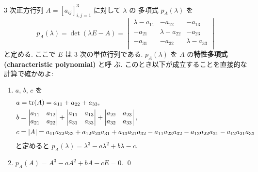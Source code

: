 \documentclass[12pt,twoside]{jarticle}
\begin{document}

\begin{question}
  \label{q:CH-3x3}
  $3$ 次正方行列 $A=[a_{ij}]_{i,j=1}^3$ に対して $\lambda$ の
  多項式 $p_A(\lambda)$ を
  \begin{equation*}
    p_A(\lambda) = \det(\lambda E - A) =
    \begin{vmatrix}
      \lambda-a_{11} &        -a_{12} &        -a_{13} \\
             -a_{21} & \lambda-a_{22} &        -a_{23} \\
             -a_{31} &        -a_{32} & \lambda-a_{33} \\
    \end{vmatrix}
  \end{equation*}
  と定める.  ここで $E$ は $3$ 次の単位行列である. 
  $p_A(\lambda)$ を $A$ の{\bf 特性多項式 (characteristic polynomial)} と呼
  ぶ. このとき以下が成立することを直接的な計算で確かめよ:
  \begin{enumerate}
  \item $a$, $b$, $c$ を
    \begin{align*}
      &
      a = \mathop{\mathrm{tr}}\nolimits(A) = a_{11} + a_{22} + a_{33}, 
      \\ &
      b = 
      \begin{vmatrix}
        a_{11} & a_{12} \\
        a_{21} & a_{22} \\
      \end{vmatrix}
      +
      \begin{vmatrix}
        a_{11} & a_{13} \\
        a_{31} & a_{33} \\
      \end{vmatrix}
      +
      \begin{vmatrix}
        a_{22} & a_{23} \\
        a_{32} & a_{33} \\
      \end{vmatrix},
      \\ &
      c = |A| =
        a_{11}a_{22}a_{33}
      + a_{12}a_{23}a_{31}
      + a_{13}a_{21}a_{32}
      - a_{11}a_{23}a_{32}
      - a_{13}a_{22}a_{31}
      - a_{12}a_{21}a_{33}
    \end{align*}
    と定めると $p_A(\lambda) = \lambda^3 - a\lambda^2 + b\lambda - c$.
  \item \( p_A(A) = A^3 - aA^2 + bA - cE = 0 \).
  \qed
  \end{enumerate}
\end{question}
\end{document}
